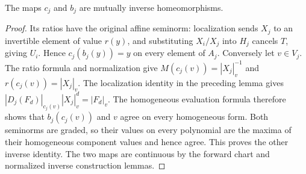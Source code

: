 \begin{theorem}
\label{charts:homeomorphism}
\leanok
{}
The maps $c_j$ and $b_j$ are mutually inverse homeomorphisms.
\end{theorem}
\begin{proof}
Its ratios have the original affine seminorm: localization sends $X_j$
to an invertible element of value $r(y)$, and substituting $X_i/X_j$
into $H_j$ cancels $T$, giving $U_i$. Hence $c_j(b_j(y))=y$ on
every element of $A_j$.
Conversely let $v\in V_j$. The ratio formula and normalization give
$M(c_j(v))=|X_j|_v^{-1}$ and $r(c_j(v))=|X_j|_v$.
The localization identity in the preceding lemma gives
$|D_j(F_d)|_{c_j(v)}|X_j|_v^d=|F_d|_v$.
The homogeneous evaluation formula therefore shows that
$b_j(c_j(v))$ and $v$ agree on every homogeneous form. Both seminorms
are graded, so their values on every polynomial are the maxima of their
homogeneous component values and hence agree. This proves the other
inverse identity. The two maps are continuous by the forward chart
and normalized inverse construction lemmas.
\end{proof}

